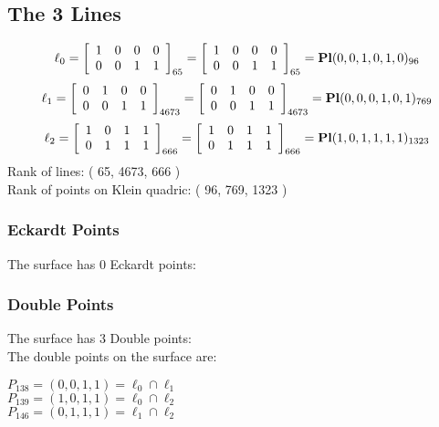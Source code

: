 \documentclass{article}
\begin{document}
{\subsection*{The 3 Lines}
$$
\ell_{0} = 
\left[
\begin{array}{*{4}{r}}
1 & 0 & 0 & 0\\
0 & 0 & 1 & 1\\
\end{array}
\right]
_{65}
=
\left[
\begin{array}{*{4}c}
1  & 0  & 0  & 0\\
0  & 0  & 1  & 1\\
\end{array}
\right]_{65}
={\rm\bf Pl}(0,0,1,0,1,0 )_{96}$$
$$
\ell_{1} = 
\left[
\begin{array}{*{4}{r}}
0 & 1 & 0 & 0\\
0 & 0 & 1 & 1\\
\end{array}
\right]
_{4673}
=
\left[
\begin{array}{*{4}c}
0  & 1  & 0  & 0\\
0  & 0  & 1  & 1\\
\end{array}
\right]_{4673}
={\rm\bf Pl}(0,0,0,1,0,1 )_{769}$$
$$
\ell_{2} = 
\left[
\begin{array}{*{4}{r}}
1 & 0 & 1 & 1\\
0 & 1 & 1 & 1\\
\end{array}
\right]
_{666}
=
\left[
\begin{array}{*{4}c}
1  & 0  & 1  & 1\\
0  & 1  & 1  & 1\\
\end{array}
\right]_{666}
={\rm\bf Pl}(1,0,1,1,1,1 )_{1323}$$
Rank of lines: ( 65, 4673, 666 )\\
Rank of points on Klein quadric: ( 96, 769, 1323 )\\
\subsubsection*{Eckardt Points}
The surface has 0 Eckardt points:\\
\subsubsection*{Double Points}
The surface has 3 Double points:\\
The double points on the surface are:\\
\begin{multicols}{2}
\noindent
$P_{138} = ( 0, 0, 1, 1 ) = \ell_{0} \cap \ell_{1} $\\
$P_{139} = ( 1, 0, 1, 1 ) = \ell_{0} \cap \ell_{2} $\\
$P_{146} = ( 0, 1, 1, 1 ) = \ell_{1} \cap \ell_{2} $\\
\end{multicols}
}
\end{document}
